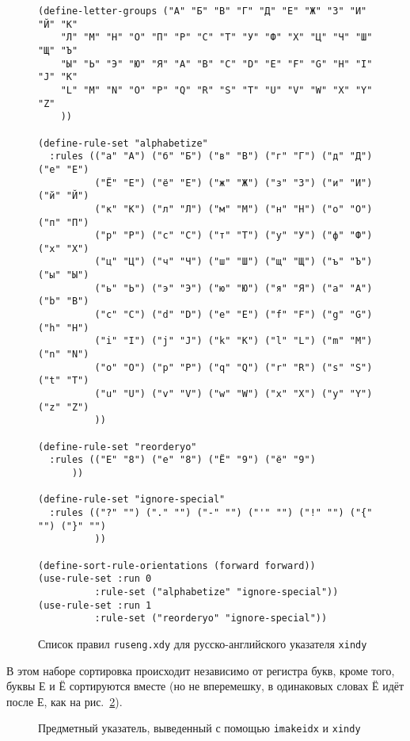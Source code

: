 \documentclass[a4paper,12pt]{article}
\newcommand\package[1]{\texttt{#1}}
\newcommand\exe[1]{\texttt{#1}}
\newcommand\file[1]{\texttt{#1}}
\begin{document}
\begin{figure}[tp]
\begin{tcolorbox}
\footnotesize
\begin{verbatim}
(define-letter-groups ("А" "Б" "В" "Г" "Д" "Е" "Ж" "З" "И" "Й" "К"
    "Л" "М" "Н" "О" "П" "Р" "С" "Т" "У" "Ф" "Х" "Ц" "Ч" "Ш" "Щ" "Ъ"
    "Ы" "Ь" "Э" "Ю" "Я" "A" "B" "C" "D" "E" "F" "G" "H" "I" "J" "K"
    "L" "M" "N" "O" "P" "Q" "R" "S" "T" "U" "V" "W" "X" "Y" "Z"
    ))

(define-rule-set "alphabetize"
  :rules (("а" "А") ("б" "Б") ("в" "В") ("г" "Г") ("д" "Д") ("е" "Е")
          ("Ё" "Е") ("ё" "Е") ("ж" "Ж") ("з" "З") ("и" "И") ("й" "Й")
          ("к" "К") ("л" "Л") ("м" "М") ("н" "Н") ("о" "О") ("п" "П")
          ("р" "Р") ("с" "С") ("т" "Т") ("у" "У") ("ф" "Ф") ("х" "Х")
          ("ц" "Ц") ("ч" "Ч") ("ш" "Ш") ("щ" "Щ") ("ъ" "Ъ") ("ы" "Ы")
          ("ь" "Ь") ("э" "Э") ("ю" "Ю") ("я" "Я") ("a" "A") ("b" "B")
          ("c" "C") ("d" "D") ("e" "E") ("f" "F") ("g" "G") ("h" "H")
          ("i" "I") ("j" "J") ("k" "K") ("l" "L") ("m" "M") ("n" "N")
          ("o" "O") ("p" "P") ("q" "Q") ("r" "R") ("s" "S") ("t" "T")
          ("u" "U") ("v" "V") ("w" "W") ("x" "X") ("y" "Y") ("z" "Z")
          ))

(define-rule-set "reorderyo"
  :rules (("Е" "8") ("е" "8") ("Ё" "9") ("ё" "9")
	  ))

(define-rule-set "ignore-special"
  :rules (("?" "") ("." "") ("-" "") ("'" "") ("!" "") ("{" "") ("}" "")
          ))

(define-sort-rule-orientations (forward forward))
(use-rule-set :run 0
	      :rule-set ("alphabetize" "ignore-special"))
(use-rule-set :run 1
	      :rule-set ("reorderyo" "ignore-special"))
\end{verbatim}
\end{tcolorbox}
\caption{Список правил \file{ruseng.xdy} для русско-английского указателя
\exe{xindy}}\label{xindy1}
\end{figure}
В этом наборе сортировка происходит независимо от регистра букв, кроме того, буквы
Е и Ё сортируются вместе (но не вперемешку, в одинаковых словах Ё идёт после Е,
как на рис.~\ref{xindy4}).
\begin{figure}[tp]
\begin{tcolorbox}[colback=white]
\centering
\small
\vspace*{-2ex}
\printindex
\end{tcolorbox}
\caption{Предметный указатель, выведенный с помощью \package{imakeidx} и
\exe{xindy}}\label{xindy4}
\end{figure}
\end{document}
